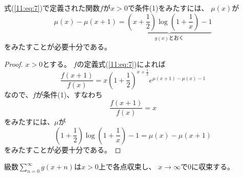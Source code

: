 \documentclass[report]{jlreq}
\begin{document}
\begin{lemma}
    式(\ref{11:eq:7})で定義された関数$f$が$x > 0$で条件(1)をみたすには、
    $\mu(x)$が
    \begin{equation}
        \mu(x) - \mu(x + 1)
            = \underbrace{
                \left(x + \frac{1}{2}\right) \log \left(1 + \frac{1}{x}\right) - 1
            }_{\text{$g(x)$とおく}}
    \end{equation}
    をみたすことが必要十分である。
    \label{11:lem:1}
\end{lemma}

\begin{proof}
    $x > 0$とする。
    $f$の定義式(\ref{11:eq:7})によれば
    \begin{equation}
        \frac{f(x + 1)}{f(x)} = x \left(1 + \frac{1}{2}\right)^{x + \frac{1}{2}} e^{\mu(x + 1) - \mu(x) - 1}
    \end{equation}
    なので、$f$が条件(1)、すなわち
    \begin{equation}
        \frac{f(x + 1)}{f(x)} = x
    \end{equation}
    をみたすには、$\mu$が
    \begin{equation}
        \left(1 + \frac{1}{2}\right) \log \left(1 + \frac{1}{x}\right) - 1 = \mu(x) - \mu(x + 1)
    \end{equation}
    をみたすことが必要十分である。
\end{proof}

    \begin{lemma}
        級数$\sum_{n=0}^\infty g(x + n)$は$x > 0$上で各点収束し、
        $x \to \infty$で$0$に収束する。
    \end{lemma}
\end{document}
